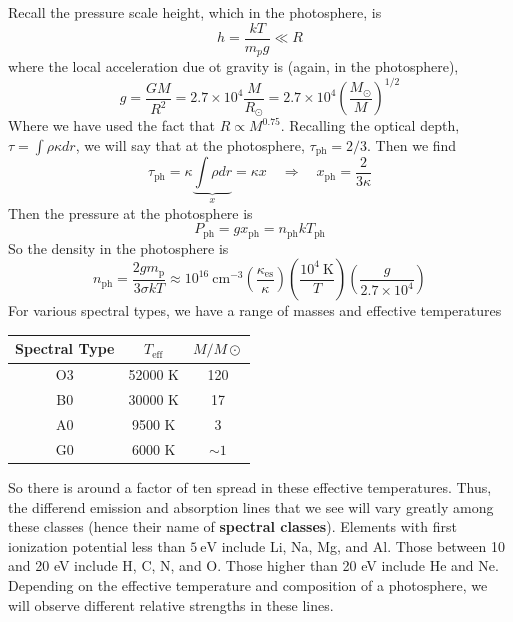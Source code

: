 \documentclass[10pt]{article}
\numberwithin{equation}{section}
\begin{document}
    Recall the pressure scale height, which in the photosphere, is
    \begin{equation}
      \label{eq:212}
      h=\frac{kT}{m_p g}\ll R
    \end{equation}
    where the local acceleration due ot gravity is (again, in the
    photosphere),
    \begin{equation}
      \label{eq:213}
      g=\frac{GM}{R^2}=2.7\times 10^4\frac{M}{R_\odot}=2.7\times
      10^4\left(\frac{M_\odot}{M}\right)^{1/2}
    \end{equation}
    Where we have used the fact that $R\propto M^{0.75}$. Recalling
    the optical depth, $\tau=\int \rho\kappa dr$, we will say that at
    the photosphere, $\tau_{\mathrm{ph}}=2/3$. Then we find
    \begin{equation}
      \label{eq:214}
      \tau_{\mathrm{ph}}=\kappa\underbrace{\int \rho dr}_{x}=\kappa
      x\quad\Rightarrow\quad x_{\mathrm{ph}}=\frac{2}{3\kappa}
    \end{equation}
    Then the pressure at the photosphere is
    \begin{equation}
      \label{eq:215}
      P_{\mathrm{ph}}=gx_{\mathrm{ph}}=n_{\mathrm{ph}}kT_{\mathrm{ph}}
    \end{equation}
    So the density in the photosphere is
    \begin{equation}
      \label{eq:216}
      n_{\mathrm{ph}}=\frac{2g m_\mathrm{p}}{3\sigma k T} \approx
      10^{16}\
        \mathrm{cm^{-3}}\left(\frac{\kappa_{\mathrm{es}}}{\kappa}\right)\left(\frac{10^4\
          \mathrm{K}}{T}\right)\left(\frac{g}{2.7\times 10^4}\right)
    \end{equation}
    For various spectral types, we have a range of masses and
    effective temperatures\\
    \begin{center}
    \begin{tabular}[h]{c c c}
      Spectral Type & $T_{\mathrm{eff}}$ & $M/M\odot$\\
      \hline\hline
      O3 & 52000 K & 120\\
      B0 & 30000 K & 17\\
      A0 & 9500 K & 3\\
      G0 & 6000 K & $\sim 1$
    \end{tabular}
    \end{center}
    So there is around a factor of ten spread in these effective
    temperatures. Thus, the differend emission and absorption lines
    that we see will vary greatly among these classes (hence their
    name of \textbf{spectral classes}). Elements with first
    ionization potential less than $5\ \mathrm{eV}$ include Li, Na,
    Mg, and Al. Those between 10 and 20 eV include H, C, N, and
    O. Those higher than 20 eV include He and Ne. Depending on the
    effective temperature and composition of a photosphere, we will
    observe different relative strengths in these lines.\\
\end{document}
